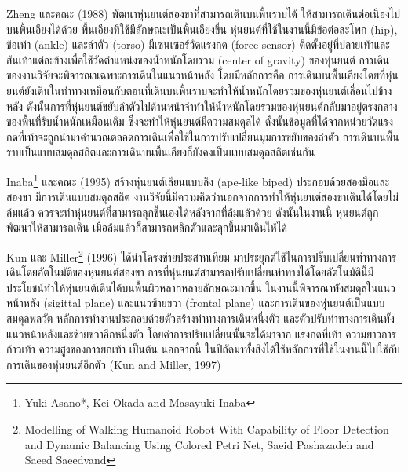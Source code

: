 Zheng และคณะ (1988) พัฒนาหุ่นยนต์สองขาที่สามารถเดินบนพื้นราบได้ ให้สามารถเดินต่อเนื่องไปบนพื้นเอียงได้ด้วย
พื้นเอียงที่ใช้มีลักษณะเป็นพื้นเอียงขึ้น หุ่นยนต์ที่ใช้ในงานนี้มีข้อต่อสะโพก (hip), ข้อเท้า (ankle) และลำตัว (torso) มีเซนเซอร์วัดแรงกด (force sensor)
ติดตั้งอยู่ที่ปลายเท้าและส้นเท้าแต่ละข้างเพื่อใช้วัดตำแหน่งของน้ำหนักโดยรวม (center of gravity) ของหุ่นยนต์ การเดินของงานวิจัยจะพิจารณาเฉพาะการเดินในแนวหน้าหลัง
โดยมีหลักการคือ การเดินบนพื้นเอียงโดยที่หุ่นยนต์ยังเดินในท่าทางเหมือนกับตอนที่เดินบนพื้นราบจะทำให้น้ำหนักโดยรวมของหุ่นยนต์เลื่อนไปข้างหลัง
ดังนั้นการที่หุ่นยนต์ขยับลำตัวไปด้านหน้าจำทำให้น้ำหนักโดยรวมของหุ่นยนต์กลับมาอยู่ตรงกลางของพื้นที่รับน้ำหนักเหมือนเดิม
ซึ่งจะทำให้หุ่นยนต์มีความสมดุลได้ ดั้งนั้นข้อมูลที่ได้จากหน่วยวัดแรงกดที่เท้าจะถูกนำมาคำนวณตลอดการเดินเพื่อใช้ในการปรับเปลี่ยนมุมการขยับของลำตัว
การเดินบนพื้นราบเป็นแบบสมดุลสถิตและการเดินบนพื้นเอียงก็ยังคงเป็นแบบสมดุลสถิตเช่นกัน

Inaba\footnote{Yuki Asano*, Kei Okada and Masayuki Inaba} และคณะ (1995) สร้างหุ่นยนต์เลียนแบบลิง (ape-like biped) ประกอบด้วยสองมือและสองขา มีการเดินแบบสมดุลสถิต
งานวิจัยนี้มีความคิดว่านอกจากการทำให้หุ่นยนต์สองขาเดินได้โดยไม่ล้มแล้ว ควรจะทำหุ่นยนต์ที่สามารถลุกขึ้นเองได้หลังจากที่ล้มแล้วด้วย
ดังนั้นในงานนี้ หุ่นยนต์ถูกพัฒนาให้สามารถเดิน เมื่อล้มแล้วก็สามารถพลิกตัวและลุกขึ้นมาเดินให้ได้

Kun และ Miller\footnote{Modelling of Walking Humanoid Robot With 
Capability of Floor Detection and Dynamic 
Balancing Using Colored Petri Net, Saeid Pashazadeh and Saeed Saeedvand} (1996) ได้นำโครงข่ายประสาทเทียม มาประยุกต์ใช้ในการปรับเปลี่ยนท่าทางการเดินโดยอัตโนมัติของหุ่นยนต์สองขา
การที่หุ่นยนต์สามารถปรับเปลี่ยนท่าทางได้โดยอัตโนมัตินี้มีประโยชน์ทำให้หุ่นยนต์เดินได้บนพื้นผิวหลากหลายลักษณะมากขึ้น
ในงานนี้พิจารณาท้ังสมดุลในแนวหน้าหลัง (sigittal plane) และแนวซ้ายขวา (frontal plane) และการเดินของหุุ่นยนต์เป็นแบบสมดุลพลวัต
หลักการทำงานประกอบด้วยตัวสร้างท่าทางการเดินหนึ่งตัว และตัวปรับท่าทางการเดินทั้งแนวหน้าหลังและซ้ายขวาอีกหนึ่งตัว
โดยค่าการปรับเปลี่ยนนั้นจะได้มาจาก แรงกดที่เท้า ความยาวการก้าวเท้า ความสูงของการยกเท้า เป็นต้น นอกจากนี้
ในปีถัดมาทั้งสิงได้ใช้หลักการที่ใช้ในงานนี้ไปใช้กับการเดินของหุ่นยนต์อีกตัว (Kun and Miller, 1997)

